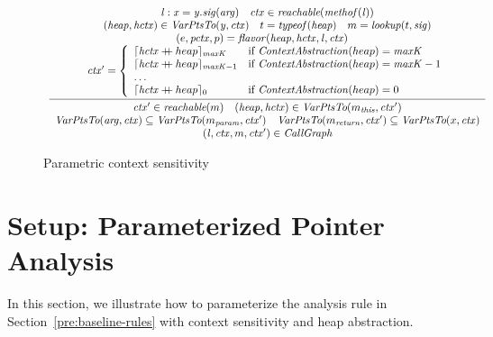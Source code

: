 

\begin{figure}[t]
	\[
	  \begin{array}{c}
		\infer[]
		{
		\begin{array}{c}
		  \ctx' \in \Reachable ({m}) \quad
		  ({\heap}, {\hctx}) \in  \VarPointsTo ({m_{\this}}, {\ctx'}) \\
		  \VarPointsTo({\it arg}, \ctx) \subseteq \VarPointsTo(m_{\it param}, \ctx')
		  \quad
		  \VarPointsTo(m_{\it return}, \ctx') \subseteq \VarPointsTo(x, \ctx)\\
		  (\invo, \ctx, m, \ctx') \in \CallGraph
		\end{array}
		}{
		\begin{array}{c}
		  {\it \invo : x = y.\sig({\it arg})} \quad
		  \ctx \in    \Reachable ({\methof(\invo)}) \\
		  ({\heap}, {\hctx})\in  \VarPointsTo ({\it y},\ctx) \quad
		  t = {\typeof}(\heap)  \quad m = {\lookup}(t, \sig) \\
  (e, {\pctx}, p) = \parent(\heap,\hctx, \invo, \ctx) \quad\\
  \ctx' = \left\{
	\begin{array}{l@{\quad}l}
	\truncateCtx{\appendCtx{{ \hctx}}{heap}}{\CallDepth}
	& \mbox{if}~\ctxAbstraction(heap) = \CallDepth \\
	\truncateCtx{\appendCtx{{ \hctx}}{heap}}{\CallDepth-1}     & \mbox{if}~\ctxAbstraction(heap) = \CallDepth-1\\
	\dots\\
	\truncateCtx{\appendCtx{{ \hctx}}{heap}}{0}
	& \mbox{if}~\ctxAbstraction(heap) = 0 \\
	\end{array}
	\right.
		\end{array}
															}
	  \end{array}
	\]
	\caption{Parametric context sensitivity}
  \label{fig:param-obj}
  \end{figure}


\section{Setup: Parameterized Pointer Analysis}

In this section, we illustrate how to parameterize the analysis rule in Section~\ref{pre:baseline-rules} with context sensitivity and heap abstraction.




